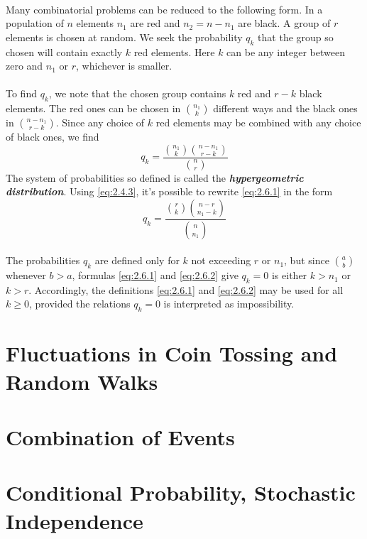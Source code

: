 \documentclass{article}
\numberwithin{equation}{subsection}
\begin{document}
		\paragraph{} Many combinatorial problems can be reduced to the following form. In a population of $n$ elements $n_1$ are red and $n_2=n-n_1$ are black. A group of $r$ elements is chosen at random. We seek the probability $q_k$ that the group so chosen will contain exactly $k$ red elements. Here $k$ can be any integer between zero and $n_1$ or $r$, whichever is smaller.
		\paragraph{} To find $q_k$, we note that the chosen group contains $k$ red and $r-k$ black elements. The red ones can be chosen in ${n_1 \choose k}$ different ways and the black ones in ${n-n_1 \choose r-k}$. Since any choice of $k$ red elements may be combined with any choice of black ones, we find
		\begin{equation}
			\label{eq:2.6.1}
			q_k = \frac{{n_1\choose k}{n-n_1 \choose r-k}}{{n \choose r}}
		\end{equation}
		The system of probabilities so defined is called the \textbf{\textit{hypergeometric distribution}}. Using \eqref{eq:2.4.3}, it's possible to rewrite \eqref{eq:2.6.1} in the form
		\begin{equation}
			\label{eq:2.6.2}
			q_k = \frac{{r \choose k}{n-r \choose n_1-k}}{{n \choose n_1}}
		\end{equation}
		\paragraph{} The probabilities $q_k$ are defined only for $k$ not exceeding $r$ or $n_1$, but since ${a\choose b}$ whenever $b>a$, formulas \eqref{eq:2.6.1} and \eqref{eq:2.6.2} give $q_k=0$ is either $k>n_1$ or $k>r$. Accordingly, the definitions \eqref{eq:2.6.1} and \eqref{eq:2.6.2} may be used for all $k\geq0$, provided the relations $q_k=0$ is interpreted as impossibility.
		
	\newpage
	\section{Fluctuations in Coin Tossing and Random Walks}
			
	\newpage
	\section{Combination of Events}
					
	\newpage
	\section{Conditional Probability, Stochastic Independence}
			
		
\end{document}
